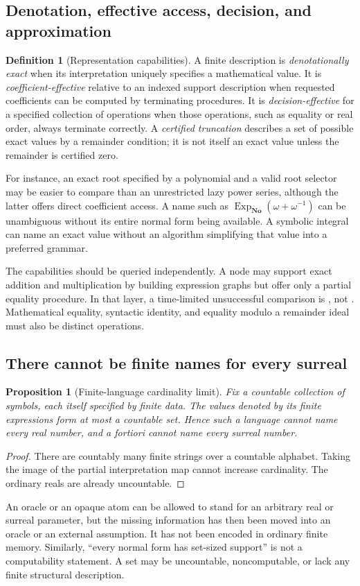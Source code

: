 \documentclass[11pt,letterpaper]{article}
\newtheorem{proposition}[theorem]{Proposition}
\theoremstyle{definition}
\newtheorem{definition}[theorem]{Definition}
\newcommand{\No}{\mathbf{No}}
\newcommand{\ExpNo}{\operatorname{Exp}_{\No}}
\newcommand{\code}[1]{\texttt{\detokenize{#1}}}
\numberwithin{equation}{section}
\begin{document}
\subsection{Denotation, effective access, decision, and approximation}
\begin{definition}[Representation capabilities]
A finite description is \emph{denotationally exact} when its interpretation uniquely specifies a mathematical value. It is \emph{coefficient-effective} relative to an indexed support description when requested coefficients can be computed by terminating procedures. It is \emph{decision-effective} for a specified collection of operations when those operations, such as equality or real order, always terminate correctly. A \emph{certified truncation} describes a set of possible exact values by a remainder condition; it is not itself an exact value unless the remainder is certified zero.
\end{definition}
For instance, an exact root specified by a polynomial and a valid root selector may be easier to compare than an unrestricted lazy power series, although the latter offers direct coefficient access. A name such as $\ExpNo(\omega+\omega^{-1})$ can be unambiguous without its entire normal form being available. A symbolic integral can name an exact value without an algorithm simplifying that value into a preferred grammar.

The capabilities should be queried independently. A node may support exact addition and multiplication by building expression graphs but offer only a partial equality procedure. In that layer, a time-limited unsuccessful comparison is \code{Unknown}, not \code{False}. Mathematical equality, syntactic identity, and equality modulo a remainder ideal must also be distinct operations.

\subsection{There cannot be finite names for every surreal}
\begin{proposition}[Finite-language cardinality limit]\label{prop:countability}
Fix a countable collection of symbols, each itself specified by finite data. The values denoted by its finite expressions form at most a countable set. Hence such a language cannot name every real number, and a fortiori cannot name every surreal number.
\end{proposition}
\begin{proof}
There are countably many finite strings over a countable alphabet. Taking the image of the partial interpretation map cannot increase cardinality. The ordinary reals are already uncountable.
\end{proof}
An oracle or an opaque atom can be allowed to stand for an arbitrary real or surreal parameter, but the missing information has then been moved into an oracle or an external assumption. It has not been encoded in ordinary finite memory. Similarly, ``every normal form has set-sized support'' is not a computability statement. A set may be uncountable, noncomputable, or lack any finite structural description.
\end{document}
